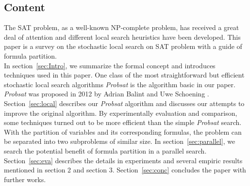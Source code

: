 \documentclass[12pt,a4paper,twoside]{scrartcl}
\numberwithin{equation}{section}
\begin{document}
\subsection{Content} 
The SAT problem, as a well-known NP-complete problem, has received a great deal of attention and different local search heuristics have been developed. This paper is a survey on the stochastic local search on SAT problem with a guide of formula partition. \\
In section~\ref{sec:Intro}, we summarize the formal concept and introduces techniques used in this paper. 
One class of the most straightforward but efficient stochastic local search algorithms  \emph{Probsat} is the algorithm basic in our paper. \emph{Probsat}  was proposed in 2012 by Adrian Balint and Uwe Schoening \cite{balint2016engineering}. Section~\ref{sec:local} describes our \emph{Probsat} algorithm and discusses our attempts to improve the original algorithm. By experimentally evaluation and comparison, some techniques turned out to be more efficient than the simple \emph{Probsat} search. With the partition of variables and its corresponding formulas, the problem can be separated into two subproblems of similar size.  In section~\ref{sec:parallel}, we search the potential benefit of formula partition in a parallel search. Section~\ref{sec:eva} describes the details in experiments and several empiric results mentioned in section 2 and section 3.  Section~\ref{sec:conc} concludes the paper with further works. 
\end{document}
